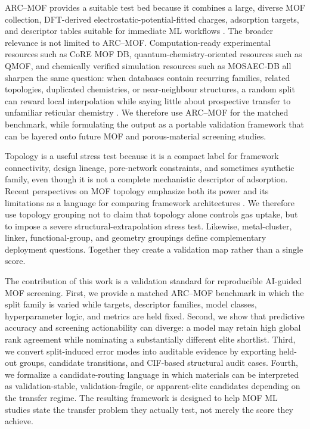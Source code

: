 \documentclass[11pt,a4paper]{article}
\begin{document}
ARC--MOF provides a suitable test bed because it combines a large, diverse MOF collection, DFT-derived electrostatic-potential-fitted charges, adsorption targets, and descriptor tables suitable for immediate ML workflows \citep{Burner2023ARCMOF}. The broader relevance is not limited to ARC--MOF. Computation-ready experimental resources such as CoRE MOF DB, quantum-chemistry-oriented resources such as QMOF, and chemically verified simulation resources such as MOSAEC-DB all sharpen the same question: when databases contain recurring families, related topologies, duplicated chemistries, or near-neighbour structures, a random split can reward local interpolation while saying little about prospective transfer to unfamiliar reticular chemistry \citep{Chung2014CoREMOF,Chung2019CoRE2019,Rosen2021QMOF,Zhao2025CoREMOF,Gibaldi2025MOSAEC}. We therefore use ARC--MOF for the matched benchmark, while formulating the output as a portable validation framework that can be layered onto future MOF and porous-material screening studies.

Topology is a useful stress test because it is a compact label for framework connectivity, design lineage, pore-network constraints, and sometimes synthetic family, even though it is not a complete mechanistic descriptor of adsorption. Recent perspectives on MOF topology emphasize both its power and its limitations as a language for comparing framework architectures \citep{Glasby2024Topology}. We therefore use topology grouping not to claim that topology alone controls gas uptake, but to impose a severe structural-extrapolation stress test. Likewise, metal-cluster, linker, functional-group, and geometry groupings define complementary deployment questions. Together they create a validation map rather than a single score.


The contribution of this work is a validation standard for reproducible AI-guided MOF screening. First, we provide a matched ARC--MOF benchmark in which the split family is varied while targets, descriptor families, model classes, hyperparameter logic, and metrics are held fixed. Second, we show that predictive accuracy and screening actionability can diverge: a model may retain high global rank agreement while nominating a substantially different elite shortlist. Third, we convert split-induced error modes into auditable evidence by exporting held-out groups, candidate transitions, and CIF-based structural audit cases. Fourth, we formalize a candidate-routing language in which materials can be interpreted as validation-stable, validation-fragile, or apparent-elite candidates depending on the transfer regime. The resulting framework is designed to help MOF ML studies state the transfer problem they actually test, not merely the score they achieve.
\end{document}
